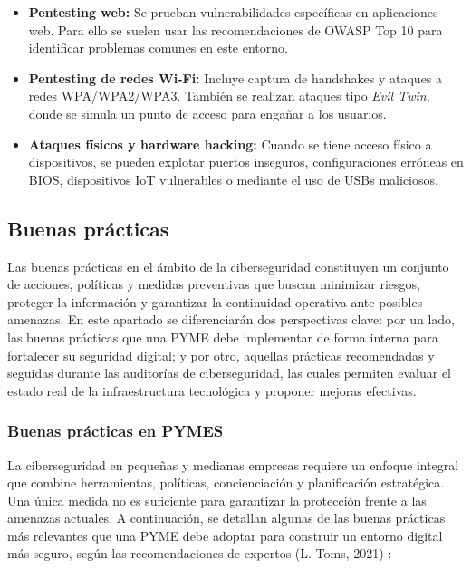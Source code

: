 \documentclass[a4paper, 10pt]{article}
\begin{document}
\begin{itemize}
      \item \textbf{Pentesting web:} Se prueban vulnerabilidades específicas en aplicaciones web. Para ello se suelen usar las recomendaciones de OWASP Top 10 para identificar problemas comunes en este entorno.
    
      \item \textbf{Pentesting de redes Wi-Fi:} Incluye captura de handshakes y ataques a redes WPA/WPA2/WPA3. También se realizan ataques tipo \textit{Evil Twin}, donde se simula un punto de acceso para engañar a los usuarios.
    
      \item \textbf{Ataques físicos y hardware hacking:} Cuando se tiene acceso físico a dispositivos, se pueden explotar puertos inseguros, configuraciones erróneas en BIOS, dispositivos IoT vulnerables o mediante el uso de USBs maliciosos.
    \end{itemize}
    
    
    \subsection{Buenas prácticas}
    Las buenas prácticas en el ámbito de la ciberseguridad constituyen un conjunto de acciones, políticas y medidas preventivas que buscan minimizar riesgos, proteger la información y garantizar la continuidad operativa ante posibles amenazas. En este apartado se diferenciarán dos perspectivas clave: por un lado, las buenas prácticas que una PYME debe implementar de forma interna para fortalecer su seguridad digital; y por otro, aquellas prácticas recomendadas y seguidas durante las auditorías de ciberseguridad, las cuales permiten evaluar el estado real de la infraestructura tecnológica y proponer mejoras efectivas.

    \subsubsection{Buenas prácticas en PYMES}
    
    La ciberseguridad en pequeñas y medianas empresas requiere un enfoque integral que combine herramientas, políticas, concienciación y planificación estratégica. Una única medida no es suficiente para garantizar la protección frente a las amenazas actuales. A continuación, se detallan algunas de las buenas prácticas más relevantes que una PYME debe adoptar para construir un entorno digital más seguro, según las recomendaciones de expertos (L. Toms, 2021) \cite{toms2021}:
    
\end{document}
